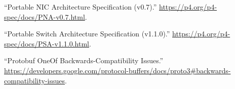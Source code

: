 \documentclass[11pt]{article}
\begin{document}
{{\begin{thebibliography}{45}
\mdbibitemlabel{{}[23]}\textquotedblleft{}Portable NIC Architecture Specification (v0.7).\textquotedblright{} \href{https://p4.org/p4-spec/docs/PNA-v0.7.html}{{\ttfamily https://\hspace{0pt}p4.\hspace{0pt}org/\hspace{0pt}p4-\hspace{0pt}spec/\hspace{0pt}docs/\hspace{0pt}PNA-\hspace{0pt}v0.\hspace{0pt}7.\hspace{0pt}html}}.\label{pna}%

\mdbibitemlabel{{}[24]}\textquotedblleft{}Portable Switch Architecture Specification (v1.1.0).\textquotedblright{} \href{https://p4.org/p4-spec/docs/PSA-v1.1.0.html}{{\ttfamily https://\hspace{0pt}p4.\hspace{0pt}org/\hspace{0pt}p4-\hspace{0pt}spec/\hspace{0pt}docs/\hspace{0pt}PSA-\hspace{0pt}v1.\hspace{0pt}1.\hspace{0pt}0.\hspace{0pt}html}}.\label{psa}%

\mdbibitemlabel{{}[25]}\textquotedblleft{}Protobuf OneOf Backwards-Compatibility Issues.\textquotedblright{} \href{https://developers.google.com/protocol-buffers/docs/proto3\%23backwards-compatibility-issues}{{\ttfamily https://\hspace{0pt}developers.\hspace{0pt}google.\hspace{0pt}com/\hspace{0pt}protocol-\hspace{0pt}buffers/\hspace{0pt}docs/\hspace{0pt}proto3\#\hspace{0pt}backwards-\hspace{0pt}compatibility-\hspace{0pt}issues}}.\label{protooneofbackwardscompatibility}%


\end{thebibliography}}}
\end{document}
